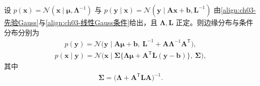 \documentclass[../../main.tex]{subfiles}
\begin{document}
\begin{proposition}\label{proposition:ch03-线性GaussBayes}
设 $p(\boldsymbol{x})=\mathcal{N}(\boldsymbol{x}\mid\boldsymbol{\mu},\boldsymbol{\Lambda}^{-1})$ 与 $p(\boldsymbol{y}\mid\boldsymbol{x})=\mathcal{N}(\boldsymbol{y}\mid\boldsymbol{A}\boldsymbol{x}+\boldsymbol{b},\boldsymbol{L}^{-1})$ 由\eqref{align:ch03-先验Gauss}与\eqref{align:ch03-线性Gauss条件}给出，且 $\boldsymbol{\Lambda},\boldsymbol{L}$ 正定。则边缘分布与条件分布分别为
\begin{align*}
p(\boldsymbol{y})=\mathcal{N}\bigl(\boldsymbol{y}\mid\boldsymbol{A}\boldsymbol{\mu}+\boldsymbol{b},\ \boldsymbol{L}^{-1}+\boldsymbol{A}\boldsymbol{\Lambda}^{-1}\boldsymbol{A}^{\mathsf{T}}\bigr),
\end{align*}
\begin{align*}
p(\boldsymbol{x}\mid\boldsymbol{y})=\mathcal{N}\bigl(\boldsymbol{x}\mid\boldsymbol{\Sigma}\{\boldsymbol{\Lambda}\boldsymbol{\mu}+\boldsymbol{A}^{\mathsf{T}}\boldsymbol{L}(\boldsymbol{y}-\boldsymbol{b})\},\ \boldsymbol{\Sigma}\bigr),
\end{align*}
其中
\begin{align}
\boldsymbol{\Sigma}=\bigl(\boldsymbol{\Lambda}+\boldsymbol{A}^{\mathsf{T}}\boldsymbol{L}\boldsymbol{A}\bigr)^{-1}.
\label{align:ch03-后验协方差形式}
\end{align}
\end{proposition}
\end{document}
